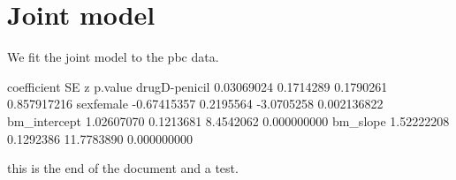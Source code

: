 \documentclass{article}
\begin{document}
\section{Joint model}
We fit the joint model to the pbc data.

\begin{Schunk}
\begin{Soutput}
              coefficient        SE          z     p.value
drugD-penicil  0.03069024 0.1714289  0.1790261 0.857917216
sexfemale     -0.67415357 0.2195564 -3.0705258 0.002136822
bm_intercept   1.02607070 0.1213681  8.4542062 0.000000000
bm_slope       1.52222208 0.1292386 11.7783890 0.000000000
\end{Soutput}
\end{Schunk}
this is the end of the document and a test.
\end{document}
